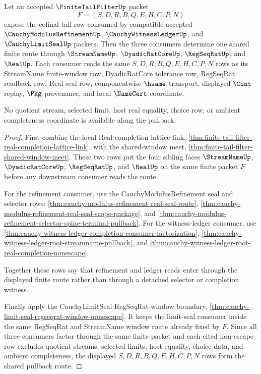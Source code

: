 \begin{theorem}
\label{thm:finite-tail-filter-refinement-seal-witness-ledger-pullback}
Let an accepted $\FiniteTailFilterUp$ packet
$$
F=(S,D,R,B,Q,E,H,C,P,N)
$$
expose the cofinal-tail row consumed by compatible accepted $\CauchyModulusRefinementUp$, $\CauchyWitnessLedgerUp$, and $\CauchyLimitSealUp$ packets. Then the three consumers determine one shared finite route through $\StreamNameUp$, $\DyadicRatCoreUp$, $\RegSeqRatUp$, and $\RealUp$. Each consumer reads the same $S,D,R,B,Q,E,H,C,P,N$ rows as its StreamName finite-window row, DyadicRatCore tolerance row, RegSeqRat readback row, Real seal row, componentwise $\hsame$ transport, displayed $\Cont$ replay, $\Pkg$ provenance, and local $\NameCert$ coordinate.

No quotient stream, selected limit, host real equality, choice row, or ambient completeness coordinate is available along the pullback.
\end{theorem}
\begin{proof}
First combine the local Real-completion lattice link, \autoref{thm:finite-tail-filter-real-completion-lattice-link}, with the shared-window meet, \autoref{thm:finite-tail-filter-shared-window-meet}. These two rows put the four sibling faces $\StreamNameUp$, $\DyadicRatCoreUp$, $\RegSeqRatUp$, and $\RealUp$ on the same finite packet $F$ before any downstream consumer reads the route.

For the refinement consumer, use the CauchyModulusRefinement seal and selector rows: \autoref{thm:cauchy-modulus-refinement-real-seal-route}, \autoref{thm:cauchy-modulus-refinement-real-seal-scope-package}, and \autoref{thm:cauchy-modulus-refinement-selector-spine-terminal-pullback}. For the witness-ledger consumer, use \autoref{thm:cauchy-witness-ledger-completion-consumer-factorization}, \autoref{thm:cauchy-witness-ledger-root-streamname-pullback}, and \autoref{thm:cauchy-witness-ledger-root-real-completion-nonescape}.

Together these rows say that refinement and ledger reads enter through the displayed finite route rather than through a detached selector or completion witness.

Finally apply the CauchyLimitSeal RegSeqRat-window boundary, \autoref{thm:cauchy-limit-seal-regseqrat-window-nonescape}. It keeps the limit-seal consumer inside the same RegSeqRat and StreamName window route already fixed by $F$. Since all three consumers factor through the same finite packet and each cited non-escape row excludes quotient streams, selected limits, host equality, choice data, and ambient completeness, the displayed $S,D,R,B,Q,E,H,C,P,N$ rows form the shared pullback route.
\end{proof}

